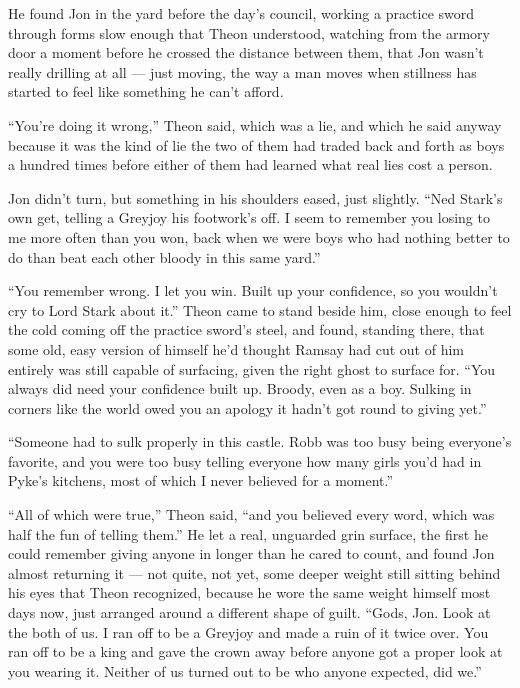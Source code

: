 He found Jon in the yard before the day’s council, working a practice sword through forms slow enough that Theon understood, watching from the armory door a moment before he crossed the distance between them, that Jon wasn’t really drilling at all — just moving, the way a man moves when stillness has started to feel like something he can’t afford.

“You’re doing it wrong,” Theon said, which was a lie, and which he said anyway because it was the kind of lie the two of them had traded back and forth as boys a hundred times before either of them had learned what real lies cost a person.

Jon didn’t turn, but something in his shoulders eased, just slightly. “Ned Stark’s own get, telling a Greyjoy his footwork’s off. I seem to remember you losing to me more often than you won, back when we were boys who had nothing better to do than beat each other bloody in this same yard.”

“You remember wrong. I let you win. Built up your confidence, so you wouldn’t cry to Lord Stark about it.” Theon came to stand beside him, close enough to feel the cold coming off the practice sword’s steel, and found, standing there, that some old, easy version of himself he’d thought Ramsay had cut out of him entirely was still capable of surfacing, given the right ghost to surface for. “You always did need your confidence built up. Broody, even as a boy. Sulking in corners like the world owed you an apology it hadn’t got round to giving yet.”

“Someone had to sulk properly in this castle. Robb was too busy being everyone’s favorite, and you were too busy telling everyone how many girls you’d had in Pyke’s kitchens, most of which I never believed for a moment.”

“All of which were true,” Theon said, “and you believed every word, which was half the fun of telling them.” He let a real, unguarded grin surface, the first he could remember giving anyone in longer than he cared to count, and found Jon almost returning it — not quite, not yet, some deeper weight still sitting behind his eyes that Theon recognized, because he wore the same weight himself most days now, just arranged around a different shape of guilt. “Gods, Jon. Look at the both of us. I ran off to be a Greyjoy and made a ruin of it twice over. You ran off to be a king and gave the crown away before anyone got a proper look at you wearing it. Neither of us turned out to be who anyone expected, did we.”

